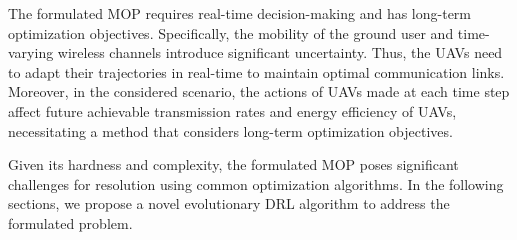 \documentclass[10pt,journal,compsoc]{IEEEtran}
\begin{document}
\par The formulated MOP requires real-time decision-making and has long-term optimization objectives. Specifically, the mobility of the ground user and time-varying wireless channels introduce significant uncertainty. Thus, the UAVs need to adapt their trajectories in real-time to maintain optimal communication links. Moreover, in the considered scenario, the actions of UAVs made at each time step affect future achievable transmission rates and energy efficiency of UAVs, necessitating a method that considers long-term optimization objectives.


\par Given its hardness and complexity, the formulated MOP poses significant challenges for resolution using common optimization algorithms. In the following sections, we propose a novel evolutionary DRL algorithm to address the formulated problem.




\end{document}

